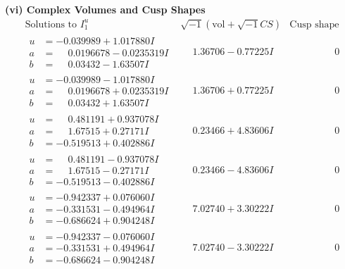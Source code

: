 \documentclass[1p]{elsarticle_modified}
\theoremstyle{definition}
\newcommand{\I}{\sqrt{-1}}
\begin{document}
\newpage\flushleft \textbf{(vi) Complex Volumes and Cusp Shapes}
$$\begin{array}{c|c|c}  
\text{Solutions to }I^u_{1}& \I (\text{vol} + \sqrt{-1}CS) & \text{Cusp shape}\\
 \hline 
\begin{aligned}
u &= -0.039989 + 1.017880 I \\
a &= \phantom{-}0.0196678 - 0.0235319 I \\
b &= \phantom{-}0.03432 - 1.63507 I\end{aligned}
 & \phantom{-}1.36706 - 0.77225 I & \phantom{-0.000000 } 0 \\ \hline\begin{aligned}
u &= -0.039989 - 1.017880 I \\
a &= \phantom{-}0.0196678 + 0.0235319 I \\
b &= \phantom{-}0.03432 + 1.63507 I\end{aligned}
 & \phantom{-}1.36706 + 0.77225 I & \phantom{-0.000000 } 0 \\ \hline\begin{aligned}
u &= \phantom{-}0.481191 + 0.937078 I \\
a &= \phantom{-}1.67515 + 0.27171 I \\
b &= -0.519513 + 0.402886 I\end{aligned}
 & \phantom{-}0.23466 + 4.83606 I & \phantom{-0.000000 } 0 \\ \hline\begin{aligned}
u &= \phantom{-}0.481191 - 0.937078 I \\
a &= \phantom{-}1.67515 - 0.27171 I \\
b &= -0.519513 - 0.402886 I\end{aligned}
 & \phantom{-}0.23466 - 4.83606 I & \phantom{-0.000000 } 0 \\ \hline\begin{aligned}
u &= -0.942337 + 0.076060 I \\
a &= -0.331531 - 0.494964 I \\
b &= -0.686624 + 0.904248 I\end{aligned}
 & \phantom{-}7.02740 + 3.30222 I & \phantom{-0.000000 } 0 \\ \hline\begin{aligned}
u &= -0.942337 - 0.076060 I \\
a &= -0.331531 + 0.494964 I \\
b &= -0.686624 - 0.904248 I\end{aligned}
 & \phantom{-}7.02740 - 3.30222 I & \phantom{-0.000000 } 0 \\ \hline\begin{aligned}

\end{aligned}
\end{array}$$
\end{document}
